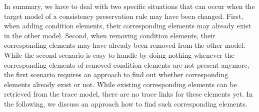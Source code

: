 In summary, we have to deal with two specific situations that can occur when the target model of a consistency preservation rule may have been changed.
First, when adding condition elements, their corresponding elements may already exist in the other model.
Second, when removing condition elements, their corresponding elements may have already been removed from the other model.
While the second scenario is easy to handle by doing nothing whenever the corresponding elements of removed condition elements are not present anymore, the first scenario requires an approach to find out whether corresponding elements already exist or not.
While existing corresponding elements can be retrieved from the trace model, there are no trace links for these elements yet.
In the following, we discuss an approach how to find such corresponding elements.




